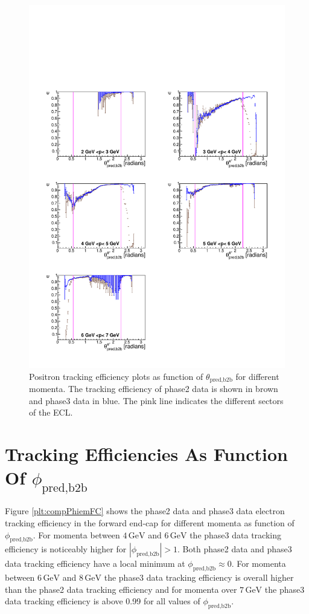 \documentclass[a4paper,11pt,twosided,final,german,openbib,pdftex,listof=totoc,bibliography=totoc]{scrbook}
\begin{document}
\begin{figure}[!htbp]
	\centering
	\includegraphics[width=\textwidth]{Plots/comp/cMThetaep_Data.pdf}
	\caption[Momentum $\theta_{\textrm{pred,b2b}}$ Positron Efficiency]{Positron tracking efficiency plots as function of $\theta_{\textrm{pred,b2b}}$ for different momenta. The tracking efficiency of phase2 data is shown in brown and phase3 data in blue. The pink line indicates the different sectors of the ECL.}
	\label{plt:compThetaep}
\end{figure}

\newpage 

\section{Tracking Efficiencies As Function Of $\phi_{\textrm{pred,b2b}}$}

Figure \ref{plt:compPhiemFC} shows the phase2 data and phase3 data electron tracking efficiency in the forward end-cap for different momenta as function of $\phi_{\textrm{pred,b2b}}$. 
For momenta between $4\,\textrm{GeV}$ and $6\,\textrm{GeV}$ the phase3 data tracking efficiency is noticeably higher for $|\phi_{\textrm{pred,b2b}}| > 1$. Both phase2 data and phase3 data tracking efficiency have a local minimum at $\phi_{\textrm{pred,b2b}} \approx 0$. 
For momenta between $6\,\textrm{GeV}$ and $8\,\textrm{GeV}$ the phase3 data tracking efficiency is overall higher than the phase2 data tracking efficiency and for momenta over $7\,\textrm{GeV}$ the phase3 data tracking efficiency is above 0.99 for all values of $\phi_{\textrm{pred,b2b}}$.
\end{document}
